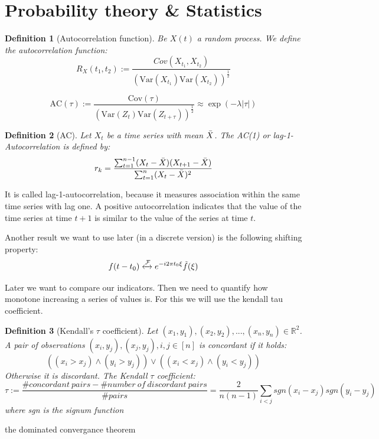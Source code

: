 \documentclass[%
thesis=student,%
coverpage=false,%
titlepage=false,%
headmarks=true, %
german,%
font=libertine, %
math=newpxtx, %
BCOR=5mm,%
coverBCOR=11mm%
]{tumbook}
\newtheorem{definition}{Definition}[section]
\begin{document}
\section{Probability theory \& Statistics}

\begin{definition}[Autocorrelation function]
Be $X(t)$ a random process. We define the autocorrelation function: 
\[
R_{X}(t_{1},t_{2}) := \frac{Cov(X_{t_{1}},X_{t_{2}})}{(\text{Var}(X_{t_{1}})\text{Var}(X_{t_{2}}))^{\frac{1}{2}}}
\]    
\end{definition}

\[
\text{AC}(\tau) := \frac{\text{Cov}(\tau)}{(\text{Var}(Z_{t})\text{Var}(Z_{t+\tau}))^{\frac{1}{2}}}\approx \exp(-\lambda\lvert\tau\rvert)
\]

\begin{definition}[AC]
Let $X_{t}$ be a time series with mean $\Bar{X}$. The AC(1) or lag-1-Autocorrelation is defined by: 
\[
r_{k} = \frac{\sum_{t=1}^{n-1}(X_{t}-\Bar{X})(X_{t+1}-\Bar{X})}{\sum_{t=1}^{n}(X_{t}-\Bar{X})^2}
\]
\end{definition}
It is called lag-1-autocorrelation, because it measures association within the same time series with lag one. A positive autocorrelation indicates that the value of the time series at time $t + 1$ is similar to the value of the series at time $t$. 


Another result we want to use later (in a discrete version) is the following shifting property:
\[
f(t-t_{0}) \xleftrightarrow{\mathcal{F}} e^{-i2\pi t_{0}\xi}\Tilde{f}(\xi)
\]

Later we want to compare our indicators. Then we need to quantify how monotone increasing a series of values is. For this we will use the kendall tau coefficient. 

\begin{definition}[Kendall's $\tau$ coefficient]
\label{def:Kendall tau}
Let $(x_{1},y_{1}),(x_{2},y_{2}),...,(x_{n},y_{n})\in \mathbb{R}^{2}$. A pair of observations $(x_{i},y_{j}),(x_{j},y_{j}), i,j \in [n]$ is concordant if it holds:
\[
((x_{i} > x_{j}) \wedge (y_{i} > y_{j})) \vee
((x_{i} < x_{j}) \wedge (y_{i} < y_{j}))
\]
Otherwise it is discordant. The Kendall $\tau$ coefficient:
\[
\tau := \frac{\#concordant\ pairs - \#number\ of\ discordant\ pairs}{\#pairs} = \frac{2}{n(n-1)}\sum_{i<j}sgn(x_{i}-x_{j})sgn(y_{i}-y_{j})
\]
where sgn is the signum function    
\end{definition}

the dominated convergance theorem
\end{document}
